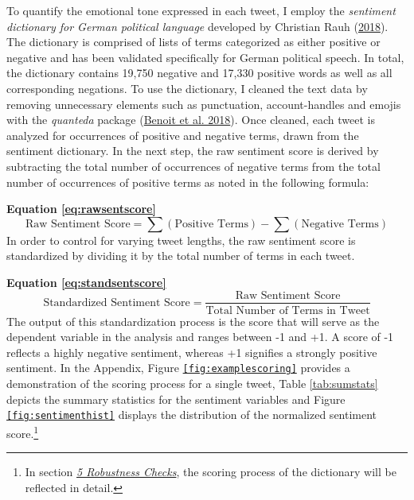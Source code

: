 \documentclass[a4paper,11pt]{article}
\begin{document}
To quantify the emotional tone expressed in each tweet, I employ the \emph{sentiment dictionary for German political language} developed by Christian Rauh (\protect\hyperlink{ref-rauhValidatingSentimentDictionary2018}{2018}). The dictionary is comprised of lists of terms categorized as either positive or negative and has been validated specifically for German political speech. In total, the dictionary contains 19,750 negative and 17,330 positive words as well as all corresponding negations. To use the dictionary, I cleaned the text data by removing unnecessary elements such as punctuation, account-handles and emojis with the \emph{quanteda} package (\protect\hyperlink{ref-benoitQuantedaPackageQuantitative2018}{Benoit et al. 2018}). Once cleaned, each tweet is analyzed for occurrences of positive and negative terms, drawn from the sentiment dictionary.
In the next step, the raw sentiment score is derived by subtracting the total number of occurrences of negative terms from the total number of occurrences of positive terms as noted in the following formula:

\textbf{Equation \eqref{eq:rawsentscore}}
\begin{equation}
\text{Raw Sentiment Score} = \sum (\text{Positive Terms}) - \sum (\text{Negative Terms})
\tag{1} 
\label{eq:rawsentscore}
\end{equation}
In order to control for varying tweet lengths, the raw sentiment score is standardized by dividing it by the total number of terms in each tweet.

\textbf{Equation \eqref{eq:standsentscore}}
\begin{equation}
\text{Standardized Sentiment Score} = \frac{\text{Raw Sentiment Score}}{\text{Total Number of Terms in Tweet}}
\tag{2} 
\label{eq:standsentscore}
\end{equation}
The output of this standardization process is the score that will serve as the dependent variable in the analysis and ranges between -1 and +1. A score of -1 reflects a highly negative sentiment, whereas +1 signifies a strongly positive sentiment. In the Appendix, Figure \texttt{\ref{fig:examplescoring}} provides a demonstration of the scoring process for a single tweet, Table \ref{tab:sumstats} depicts the summary statistics for the sentiment variables and Figure \texttt{\ref{fig:sentimenthist}} displays the distribution of the normalized sentiment score.\footnote{In section \protect\hyperlink{robustness}{\emph{5 Robustness Checks}}, the scoring process of the dictionary will be reflected in detail.}
\end{document}
